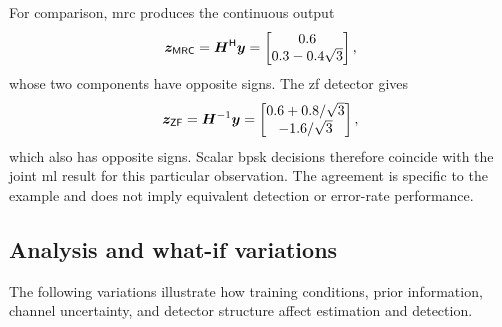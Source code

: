 For comparison, \ac{mrc} produces the continuous output
\begin{equation*}
	\bm{z}_{\mathsf{MRC}}
	={\bm{H}}^{\mathsf{H}}\bm{y}
	=\begin{bmatrix}
		0.6\\
		0.3-0.4\sqrt3
	\end{bmatrix},
\end{equation*}
whose two components have opposite signs. The \ac{zf} detector gives
\begin{equation*}
	\bm{z}_{\mathsf{ZF}}
	={\bm{H}}^{-1}\bm{y}
	=\begin{bmatrix}
		0.6+0.8/\sqrt3\\
		-1.6/\sqrt3
	\end{bmatrix},
\end{equation*}
which also has opposite signs. Scalar \ac{bpsk} decisions therefore coincide with the joint \ac{ml} result for this particular observation. The agreement is specific to the example and does not imply equivalent detection or error-rate performance.

\subsection{Analysis and what-if variations}
The following variations illustrate how training conditions, prior information, channel uncertainty, and detector structure affect estimation and detection.

